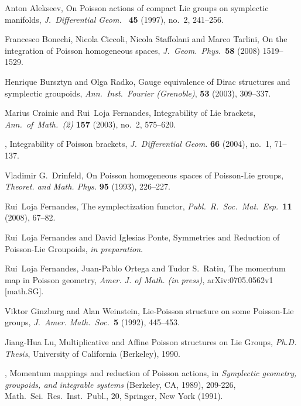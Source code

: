 \documentclass[a4paper,11pt]{amsart}
\theoremstyle{definition}
\theoremstyle{remark}
\begin{document}
\begin{thebibliography}{10}
    Anton Alekseev,
    On Poisson actions of compact Lie groups on symplectic manifolds,
    \emph{J.~Differential Geom.~} \textbf{45} (1997), no.~2, 241--256.

    Francesco Bonechi, Nicola Ciccoli, Nicola Staffolani and Marco Tarlini,
    On the integration of Poisson homogeneous spaces, \emph{J.~Geom.~Phys.~}\textbf{58} (2008) 1519--1529.

        Henrique Bursztyn and Olga Radko,
        Gauge equivalence of Dirac structures and symplectic groupoids, \emph{Ann.~Inst.~Fourier (Grenoble)}, \textbf{53} (2003), 309--337.

    Marius Crainic and Rui~Loja Fernandes,
    Integrability of {L}ie brackets,
  \emph{Ann.~of~Math.~(2)} \textbf{157} (2003), no.~2, 575--620.

  \bysame, Integrability of {P}oisson brackets, \emph{J.~Differential Geom.}
  \textbf{66} (2004), no.~1, 71--137.

      Vladimir G.~Drinfeld, On Poisson homogeneous spaces of Poisson-Lie groups,
      \emph{Theoret. and Math. Phys.} \textbf{95} (1993), 226--227.

      Rui~Loja Fernandes,
      The symplectization functor,
      \emph{Publ.~R.~Soc.~Mat.~Esp.~}\textbf{11} (2008), 67--82.

      Rui~Loja Fernandes and David Iglesias Ponte, Symmetries and Reduction of Poisson-Lie Groupoids, \emph{in preparation}.

    Rui~Loja Fernandes, Juan-Pablo Ortega and Tudor S.~Ratiu,
    The momentum map in Poisson geometry,
    \emph{Amer. J. of Math. (in press)}, arXiv:0705.0562v1 [math.SG].

        Viktor Ginzburg and Alan Weinstein,
        Lie-Poisson structure on some Poisson-Lie groups, \emph{J.~Amer. Math.~Soc.~}\textbf{5} (1992), 445--453.

    Jiang-Hua Lu,
    Multiplicative and Affine Poisson structures on Lie Groups,
    \emph{Ph.D. Thesis}, University of California (Berkeley), 1990.

    \bysame,
        Momentum mappings and reduction of Poisson actions,
        in \emph{Symplectic geometry, groupoids, and integrable systems} (Berkeley, CA, 1989), 209-226,
        Math.~Sci.~Res.~Inst.~Publ., 20, Springer, New York (1991).


\end{thebibliography}
\end{document}
